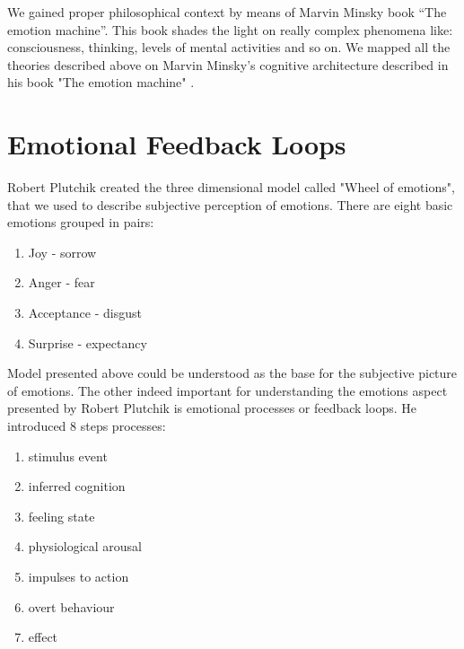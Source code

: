 We gained proper philosophical context by means of Marvin Minsky book ``The emotion machine''. This book shades the light on really complex phenomena like: consciousness, thinking, levels of mental activities and so on. We mapped all the theories described above on Marvin Minsky's cognitive architecture described in his book "The emotion machine" \cite{emotionmachine}.

\section{Emotional Feedback Loops}

Robert Plutchik created the three dimensional model \cite{natureofemotions} called "Wheel of emotions", that we used to describe subjective perception of emotions. There are eight basic emotions grouped in pairs:

\begin{enumerate}
 \item  Joy - sorrow
 \item  Anger - fear
 \item  Acceptance - disgust
 \item  Surprise - expectancy
\end{enumerate}

Model presented above could be understood as the base for the subjective picture of emotions. The other indeed important for understanding the emotions aspect presented by Robert Plutchik is emotional processes or feedback loops. He introduced 8 steps processes:

\begin{enumerate}
 \item{stimulus event}
 \item{inferred cognition}
 \item{feeling state}
 \item{physiological arousal}
 \item{impulses to action}
 \item{overt behaviour}
 \item{effect}
\end{enumerate}

